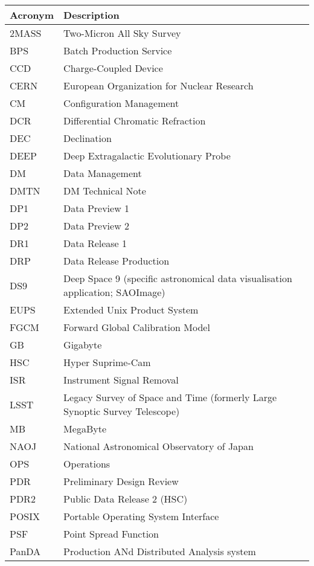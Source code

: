 \addtocounter{table}{-1}
\begin{longtable}{p{}p{}}\hline
\textbf{Acronym} & \textbf{Description}  \\\hline

2MASS & Two-Micron All Sky Survey \\\hline
BPS & Batch Production Service \\\hline
CCD & Charge-Coupled Device \\\hline
CERN & European Organization for Nuclear Research \\\hline
CM & Configuration Management \\\hline
DCR & Differential Chromatic Refraction \\\hline
DEC & Declination \\\hline
DEEP & Deep Extragalactic Evolutionary Probe \\\hline
DM & Data Management \\\hline
DMTN & DM Technical Note \\\hline
DP1 & Data Preview 1 \\\hline
DP2 & Data Preview 2 \\\hline
DR1 & Data Release 1 \\\hline
DRP & Data Release Production \\\hline
DS9 & Deep Space 9 (specific astronomical data visualisation application; SAOImage) \\\hline
EUPS & Extended Unix Product System \\\hline
FGCM & Forward Global Calibration Model \\\hline
GB & Gigabyte \\\hline
HSC & Hyper Suprime-Cam \\\hline
ISR & Instrument Signal Removal \\\hline
LSST & Legacy Survey of Space and Time (formerly Large Synoptic Survey Telescope) \\\hline
MB & MegaByte \\\hline
NAOJ & National Astronomical Observatory of Japan \\\hline
OPS & Operations \\\hline
PDR & Preliminary Design Review \\\hline
PDR2 & Public Data Release 2 (HSC) \\\hline
POSIX & Portable Operating System Interface \\\hline
PSF & Point Spread Function \\\hline
PanDA &  Production ANd Distributed Analysis system \\\hline

\end{longtable}
